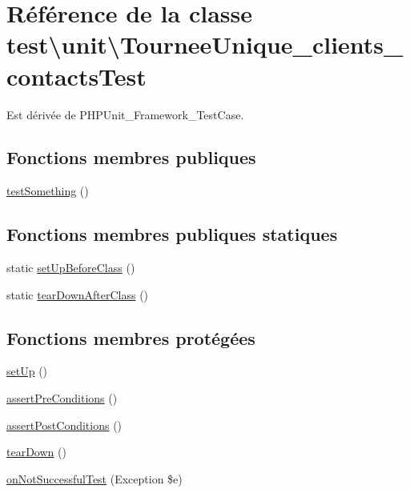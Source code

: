 \hypertarget{classtest_1_1unit_1_1TourneeUnique__clients__contactsTest}{}\section{Référence de la classe test\textbackslash{}unit\textbackslash{}Tournee\+Unique\+\_\+clients\+\_\+contacts\+Test}
\label{classtest_1_1unit_1_1TourneeUnique__clients__contactsTest}


Est dérivée de P\+H\+P\+Unit\+\_\+\+Framework\+\_\+\+Test\+Case.

\subsection*{Fonctions membres publiques}
\begin{DoxyCompactItemize}
\item 
\hyperlink{classtest_1_1unit_1_1TourneeUnique__clients__contactsTest_ac1399303c6e8ada204c374dbe0cadf75}{test\+Something} ()
\end{DoxyCompactItemize}
\subsection*{Fonctions membres publiques statiques}
\begin{DoxyCompactItemize}
\item 
static \hyperlink{classtest_1_1unit_1_1TourneeUnique__clients__contactsTest_a0ab59455ca6b56fae94cb80faab375ee}{set\+Up\+Before\+Class} ()
\item 
static \hyperlink{classtest_1_1unit_1_1TourneeUnique__clients__contactsTest_a36a9d8ff238c3b3c41bcb666ad436394}{tear\+Down\+After\+Class} ()
\end{DoxyCompactItemize}
\subsection*{Fonctions membres protégées}
\begin{DoxyCompactItemize}
\item 
\hyperlink{classtest_1_1unit_1_1TourneeUnique__clients__contactsTest_a8fcc05e8daafdc8b3d580ac162078452}{set\+Up} ()
\item 
\hyperlink{classtest_1_1unit_1_1TourneeUnique__clients__contactsTest_a68d9c0cc2bd3fcd86ba48f729bbb526a}{assert\+Pre\+Conditions} ()
\item 
\hyperlink{classtest_1_1unit_1_1TourneeUnique__clients__contactsTest_a3ebc15721fbf969a546b03cfa5acb7d2}{assert\+Post\+Conditions} ()
\item 
\hyperlink{classtest_1_1unit_1_1TourneeUnique__clients__contactsTest_ac8dc51833339fb6978ab9073cbc90d54}{tear\+Down} ()
\item 
\hyperlink{classtest_1_1unit_1_1TourneeUnique__clients__contactsTest_a01a06d1fd1787ddf2c796bd58ea595ea}{on\+Not\+Successful\+Test} (Exception \$e)
\end{DoxyCompactItemize}


